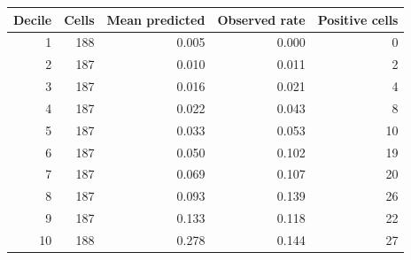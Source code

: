 \begin{tabular}{rrrrr}
\toprule
Decile & Cells & Mean predicted & Observed rate & Positive cells \\
\midrule
1 & 188 & 0.005 & 0.000 & 0 \\
2 & 187 & 0.010 & 0.011 & 2 \\
3 & 187 & 0.016 & 0.021 & 4 \\
4 & 187 & 0.022 & 0.043 & 8 \\
5 & 187 & 0.033 & 0.053 & 10 \\
6 & 187 & 0.050 & 0.102 & 19 \\
7 & 187 & 0.069 & 0.107 & 20 \\
8 & 187 & 0.093 & 0.139 & 26 \\
9 & 187 & 0.133 & 0.118 & 22 \\
10 & 188 & 0.278 & 0.144 & 27 \\
\bottomrule
\end{tabular}
